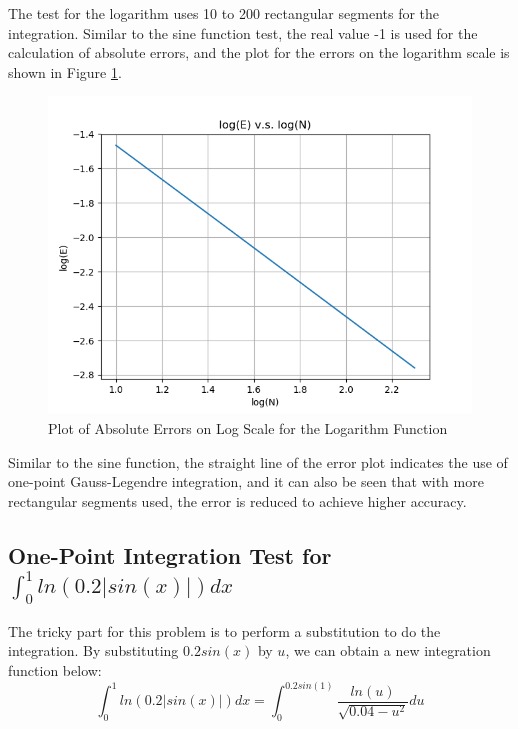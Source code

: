 \documentclass[a4paper,titlepage]{article}
\begin{document}
			The test for the logarithm uses 10 to 200 rectangular segments for the integration. Similar to the sine function test, the real value -1 is used for the calculation of absolute errors, and the plot for the errors on the logarithm scale is shown in Figure \ref{log_err_int}.
			\begin{figure}[!h]
				\centering
				\includegraphics[width=\linewidth]{../data/ln_err_int}
				\caption{Plot of Absolute Errors on Log Scale for the Logarithm Function}
				\label{log_err_int}
			\end{figure}
		
			Similar to the sine function, the straight line of the error plot indicates the use of one-point Gauss-Legendre integration, and it can also be seen that with more rectangular segments used, the error is reduced to achieve higher accuracy. 
			
		\subsection{One-Point Integration Test for $\int_{0}^{1}ln(0.2|sin(x)|)dx$}
			The tricky part for this problem is to perform a substitution to do the integration. By substituting $0.2sin(x)$ by $u$, we can obtain a new integration function below:
			$$
				\int_{0}^{1}ln(0.2|sin(x)|)dx = \int_{0}^{0.2sin(1)} \frac{ln(u)}{\sqrt{0.04 - u^2}}du
			$$
			
\end{document}
